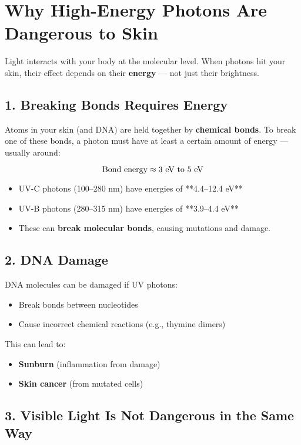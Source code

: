 \documentclass[12pt]{article}
\begin{document}
\section*{Why High-Energy Photons Are Dangerous to Skin}

Light interacts with your body at the molecular level. When photons hit your skin, their effect depends on their \textbf{energy} — not just their brightness.

\subsection*{1. Breaking Bonds Requires Energy}

Atoms in your skin (and DNA) are held together by \textbf{chemical bonds}. To break one of these bonds, a photon must have at least a certain amount of energy — usually around:

\[
\text{Bond energy} \approx 3\ \text{eV to 5\ \text{eV}}
\]

\begin{itemize}
    \item UV-C photons (100–280 nm) have energies of **4.4–12.4 eV**
    \item UV-B photons (280–315 nm) have energies of **3.9–4.4 eV**
    \item These can \textbf{break molecular bonds}, causing mutations and damage.
\end{itemize}

\subsection*{2. DNA Damage}

DNA molecules can be damaged if UV photons:
\begin{itemize}
    \item Break bonds between nucleotides
    \item Cause incorrect chemical reactions (e.g., thymine dimers)
\end{itemize}

This can lead to:
\begin{itemize}
    \item \textbf{Sunburn} (inflammation from damage)
    \item \textbf{Skin cancer} (from mutated cells)
\end{itemize}

\subsection*{3. Visible Light Is Not Dangerous in the Same Way}
\end{document}
